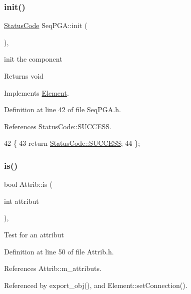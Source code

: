 \subsubsection{\texorpdfstring{init()}{init()}}
{\footnotesize\ttfamily \hyperlink{classStatusCode}{Status\+Code} Seq\+P\+G\+A\+::init (\begin{DoxyParamCaption}{ }\end{DoxyParamCaption})\hspace{0.3cm}{\ttfamily [inline]}, {\ttfamily [virtual]}}

init the component

\begin{DoxyReturn}{Returns}
void 
\end{DoxyReturn}


Implements \hyperlink{classElement_af42754b5cabc198869222725218d695c}{Element}.



Definition at line 42 of file Seq\+P\+G\+A.\+h.



References Status\+Code\+::\+S\+U\+C\+C\+E\+SS.


\begin{DoxyCode}
42                     \{
43     \textcolor{keywordflow}{return} \hyperlink{classStatusCode_a6f565cbeadc76d14c72f047e5e85eb4badd0da38d3ba0d922efd1f4619bc37ad8}{StatusCode::SUCCESS};
44   \};
\end{DoxyCode}
\mbox{\label{classAttrib_a704f26af560909ad22065083bb7d4c34}} 
\subsubsection{\texorpdfstring{is()}{is()}}
{\footnotesize\ttfamily bool Attrib\+::is (\begin{DoxyParamCaption}\item[{int}]{attribut }\end{DoxyParamCaption})\hspace{0.3cm}{\ttfamily [inline]}, {\ttfamily [inherited]}}

Test for an attribut 

Definition at line 50 of file Attrib.\+h.



References Attrib\+::m\+\_\+attributs.



Referenced by export\+\_\+obj(), and Element\+::set\+Connection().


